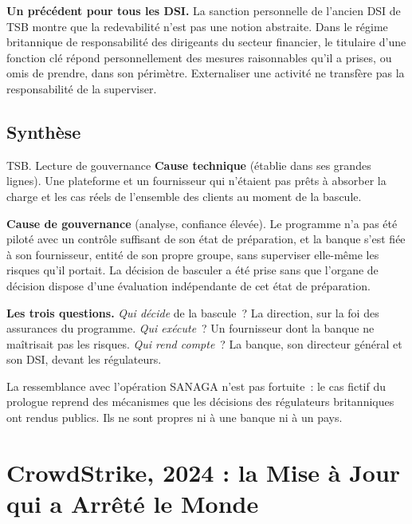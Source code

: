 \begin{boxinfo}
\textbf{Un précédent pour tous les DSI.} La sanction personnelle de
l'ancien DSI de TSB montre que la redevabilité n'est pas une notion
abstraite. Dans le régime britannique de responsabilité des dirigeants du
secteur financier, le titulaire d'une fonction clé répond personnellement
des mesures raisonnables qu'il a prises, ou omis de prendre, dans son
périmètre. Externaliser une activité ne transfère pas la responsabilité de
la superviser.
\end{boxinfo}

\subsection{Synthèse}

\begin{boxscenario}{TSB. Lecture de gouvernance}
\textbf{Cause technique} (établie dans ses grandes lignes). Une plateforme
et un fournisseur qui n'étaient pas prêts à absorber la charge et les cas
réels de l'ensemble des clients au moment de la bascule.

\medskip
\textbf{Cause de gouvernance} (analyse, confiance élevée). Le programme n'a
pas été piloté avec un contrôle suffisant de son état de préparation, et
la banque s'est fiée à son fournisseur, entité de son propre groupe, sans
superviser elle-même les risques qu'il portait. La décision de basculer a
été prise sans que l'organe de décision dispose d'une évaluation
indépendante de cet état de préparation.

\medskip
\textbf{Les trois questions.} \emph{Qui décide} de la bascule~? La
direction, sur la foi des assurances du programme. \emph{Qui exécute}~?
Un fournisseur dont la banque ne maîtrisait pas les risques. \emph{Qui
rend compte}~? La banque, son directeur général et son DSI, devant les
régulateurs.
\end{boxscenario}

La ressemblance avec l'opération SANAGA n'est pas fortuite~: le cas fictif
du prologue reprend des mécanismes que les décisions des régulateurs
britanniques ont rendus publics. Ils ne sont propres ni à une banque ni à
un pays.

\section{CrowdStrike, 2024 : la Mise à Jour qui a Arrêté le Monde}
\label{sec:c02-crowdstrike}


